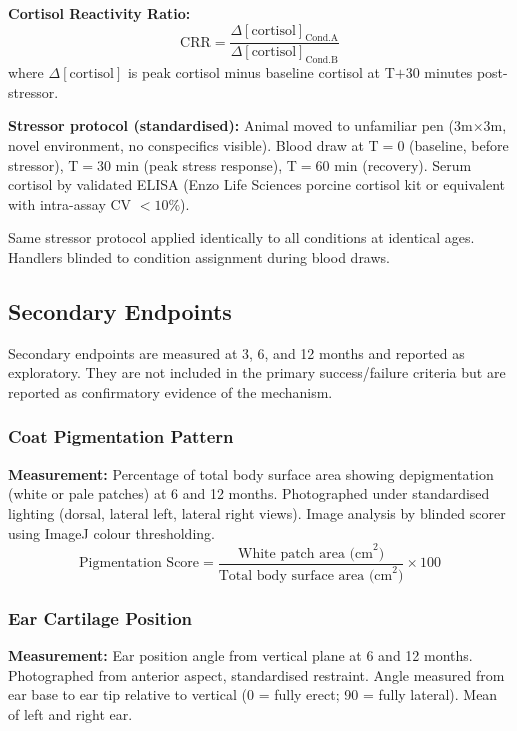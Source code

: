 \documentclass[10pt, a4paper]{article}
\begin{document}
\textbf{Cortisol Reactivity Ratio:}
\[
  \text{CRR} = \frac{\Delta[\text{cortisol}]
  _{\text{Cond.A}}}
  {\Delta[\text{cortisol}]_{\text{Cond.B}}}
\]
where $\Delta[\text{cortisol}]$ is peak cortisol
minus baseline cortisol at T$+$30 minutes
post-stressor.

\textbf{Stressor protocol (standardised):}
Animal moved to unfamiliar pen (3m$\times$3m,
novel environment, no conspecifics visible).
Blood draw at T$=$0 (baseline, before stressor),
T$=$30 min (peak stress response),
T$=$60 min (recovery).
Serum cortisol by validated ELISA
(Enzo Life Sciences porcine cortisol kit
or equivalent with intra-assay CV $< 10\%$).

Same stressor protocol applied identically
to all conditions at identical ages.
Handlers blinded to condition assignment
during blood draws.

\subsection{Secondary Endpoints}

Secondary endpoints are measured at 3, 6,
and 12 months and reported as exploratory.
They are not included in the primary
success/failure criteria but are reported
as confirmatory evidence of the mechanism.

\subsubsection{Coat Pigmentation Pattern}

\textbf{Measurement:} Percentage of total
body surface area showing depigmentation
(white or pale patches) at 6 and 12 months.
Photographed under standardised lighting
(dorsal, lateral left, lateral right views).
Image analysis by blinded scorer using
ImageJ colour thresholding.
\[
  \text{Pigmentation Score} =
  \frac{\text{White patch area (cm}^2\text{)}}
  {\text{Total body surface area (cm}^2\text{)}}
  \times 100
\]

\subsubsection{Ear Cartilage Position}

\textbf{Measurement:} Ear position angle from
vertical plane at 6 and 12 months.
Photographed from anterior aspect, standardised
restraint. Angle measured from ear base to ear
tip relative to vertical (0\textdegree{} =
fully erect; 90\textdegree{} = fully lateral).
Mean of left and right ear.
\end{document}
